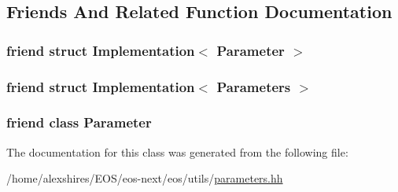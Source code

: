 \subsection{Friends And Related Function Documentation}
\hypertarget{classeos_1_1Parameters_a321bcfc7467eb8a305a7e15f232efa38}{
\subsubsection[{Implementation$<$ Parameter $>$}]{\setlength{\rightskip}{0pt plus 5cm}friend struct Implementation$<$ {\bf Parameter} $>$}}
\label{classeos_1_1Parameters_a321bcfc7467eb8a305a7e15f232efa38}
\hypertarget{classeos_1_1Parameters_afdc1ae1c3b0dbac4fdf6769d5f8e1fbf}{
\subsubsection[{Implementation$<$ Parameters $>$}]{\setlength{\rightskip}{0pt plus 5cm}friend struct Implementation$<$ {\bf Parameters} $>$}}
\label{classeos_1_1Parameters_afdc1ae1c3b0dbac4fdf6769d5f8e1fbf}
\hypertarget{classeos_1_1Parameters_ac1c4326186d13e3c1f20eb8f39a7b5a2}{
\subsubsection[{Parameter}]{\setlength{\rightskip}{0pt plus 5cm}friend class {\bf Parameter}}}
\label{classeos_1_1Parameters_ac1c4326186d13e3c1f20eb8f39a7b5a2}


The documentation for this class was generated from the following file:\begin{DoxyCompactItemize}
\item 
/home/alexshires/EOS/eos-\/next/eos/utils/\hyperlink{parameters_8hh}{parameters.hh}\end{DoxyCompactItemize}
